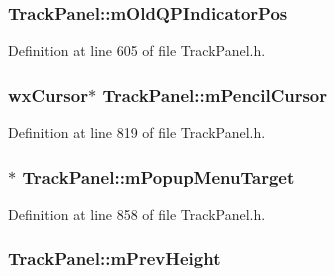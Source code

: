 \subsubsection[{\texorpdfstring{m\+Old\+Q\+P\+Indicator\+Pos}{mOldQPIndicatorPos}}]{ Track\+Panel\+::m\+Old\+Q\+P\+Indicator\+Pos\hspace{0.3cm}{\ttfamily [protected]}}\hypertarget{class_track_panel_a3db59897498463b3928e03fe5847a0aa}{}\label{class_track_panel_a3db59897498463b3928e03fe5847a0aa}


Definition at line 605 of file Track\+Panel.\+h.

\subsubsection[{\texorpdfstring{m\+Pencil\+Cursor}{mPencilCursor}}]{\setlength{\rightskip}{0pt plus 5cm}wx\+Cursor$\ast$ Track\+Panel\+::m\+Pencil\+Cursor\hspace{0.3cm}{\ttfamily [protected]}}\hypertarget{class_track_panel_aa6e6a57e571eec0f9842558b04945b1c}{}\label{class_track_panel_aa6e6a57e571eec0f9842558b04945b1c}


Definition at line 819 of file Track\+Panel.\+h.

\subsubsection[{\texorpdfstring{m\+Popup\+Menu\+Target}{mPopupMenuTarget}}]{$\ast$ Track\+Panel\+::m\+Popup\+Menu\+Target\hspace{0.3cm}{\ttfamily [protected]}}\hypertarget{class_track_panel_a3a96552d3188cea6a3b14cee137a946c}{}\label{class_track_panel_a3a96552d3188cea6a3b14cee137a946c}


Definition at line 858 of file Track\+Panel.\+h.

\subsubsection[{\texorpdfstring{m\+Prev\+Height}{mPrevHeight}}]{ Track\+Panel\+::m\+Prev\+Height\hspace{0.3cm}{\ttfamily [protected]}}\hypertarget{class_track_panel_a2f4409a90287cd2316f2a1aa26608108}{}\label{class_track_panel_a2f4409a90287cd2316f2a1aa26608108}


